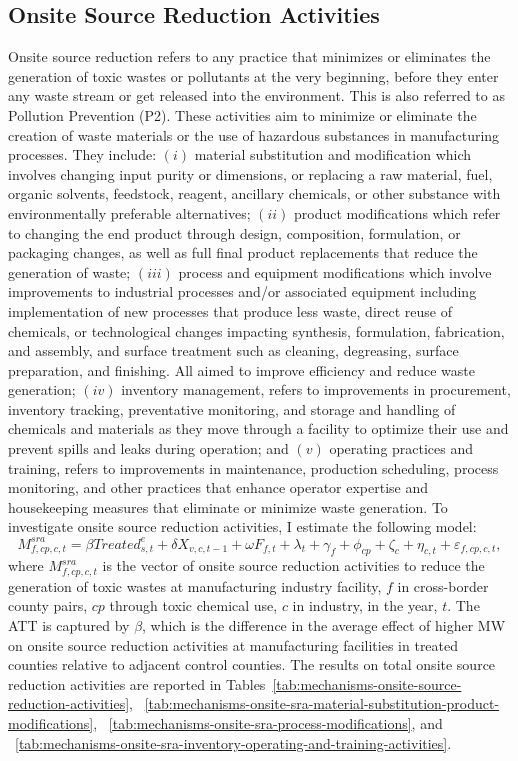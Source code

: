 \documentclass[12pt, english]{article}
\begin{document}
    \subsection{Onsite Source Reduction Activities}\label{subsec:onsite-source-reduction-activities}
    Onsite source reduction refers to any practice that minimizes or eliminates the generation of toxic wastes or pollutants at the very beginning, before they enter any waste stream or get released into the environment. This is also referred to as Pollution Prevention (P2). These activities aim to minimize or eliminate the creation of waste materials or the use of hazardous substances in manufacturing processes. They include: $(i)$ material substitution and modification which involves changing input purity or dimensions, or replacing a raw material, fuel, organic solvents, feedstock, reagent, ancillary chemicals, or other substance with environmentally preferable alternatives; $(ii)$ product modifications which refer to changing the end product through design, composition, formulation, or packaging changes, as well as full final product replacements that reduce the generation of waste; $(iii)$ process and equipment modifications which involve improvements to industrial processes and/or associated equipment including implementation of new processes that produce less waste, direct reuse of chemicals, or technological changes impacting synthesis, formulation, fabrication, and assembly, and surface treatment such as cleaning, degreasing, surface preparation, and finishing. All aimed to improve efficiency and reduce waste generation; $(iv)$ inventory management, refers to improvements in procurement, inventory tracking, preventative monitoring, and storage and handling of chemicals and materials as they move through a facility to optimize their use and prevent spills and leaks during operation; and $(v)$ operating practices and training, refers to improvements in maintenance, production scheduling, process monitoring, and other practices that enhance operator expertise and housekeeping measures that eliminate or minimize waste generation. To investigate onsite source reduction activities, I estimate the following model:
    \begin{equation}
        M_{f,cp,c,t}^{sra} = \beta Treated_{s,t}^e + \delta X_{v,c,t-1} + \omega F_{f,t} + \lambda_{t} + \gamma_{f} + \phi_{cp} + \zeta_{c} + \eta_{c,t} + \varepsilon_{f,cp,c,t},\label{eq:mechanisms-source-reduction}
    \end{equation}
    where $M_{f,cp,c,t}^{sra}$ is the vector of onsite source reduction activities to reduce the generation of toxic wastes at manufacturing industry facility, $f$ in cross-border county pairs, $cp$ through toxic chemical use, $c$ in industry, in the year, $t$. The ATT is captured by $\beta$, which is the difference in the average effect of higher MW on onsite source reduction activities at manufacturing facilities in treated counties relative to adjacent control counties. The results on total onsite source reduction activities are reported in Tables~\ref{tab:mechanisms-onsite-source-reduction-activities}, ~\ref{tab:mechanisms-onsite-sra-material-substitution-product-modifications}, ~\ref{tab:mechanisms-onsite-sra-process-modifications}, and ~\ref{tab:mechanisms-onsite-sra-inventory-operating-and-training-activities}.
\end{document}
